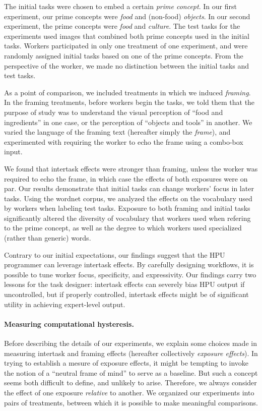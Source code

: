 \documentclass[12pt]{article}
\begin{document}
The initial tasks were chosen to embed a certain \textit{prime concept}.
In our first experiment, our prime concepts were \textit{food} and (non-food) 
\textit{objects}.  In our second experiment, the prime concepts were 
\textit{food} and \textit{culture}.  The test tasks for the experiments used 
images that combined both prime concepts used in the initial tasks. Workers 
participated in only one treatment of one experiment, and were randomly 
assigned initial tasks based on one of the 
prime concepts.  From the perspective of the worker, we made no distinction 
between the initial tasks and test tasks.

As a point of comparison, we included treatments in which we induced
\textit{framing}.
In the framing treatments, before workers begin the tasks, we told them that 
the purpose of study was to understand the visual perception of 
``food and ingredients'' in one case, or the 
perception of ``objects and tools'' in another.  We varied the language of 
the framing text (hereafter simply the \textit{frame}), and experimented with 
requiring the worker to echo the frame using a combo-box input.

We found that intertask effects were stronger than framing, unless the worker
was required to echo the frame, in which case the effects of both exposures were on par.  
Our results demonstrate that initial tasks can change 
workers' focus in later tasks.  Using the wordnet corpus, we analyzed 
the effects on the vocabulary used by workers when 
labeling test tasks. 
Exposure to both framing and initial tasks significantly altered the 
diversity of vocabulary that workers used when refering to the prime concept,
as well as the degree to which workers used specialized (rather than generic) 
words.

Contrary to our initial expectations, our findings suggest that the HPU 
programmer can leverage intertask effects.  By carefully designing workflows,
it is possible to tune worker focus, specificity, and expressivity.  Our 
findings carry two lessons for the task designer: intertask
effects can severely bias HPU output if uncontrolled, but if properly 
controlled, intertask effects might be of significant utility in achieving 
expert-level output.

\paragraph*{Measuring computational hysteresis.}
Before describing the details of our experiments, we explain some 
choices made in measuring intertask and framing effects 
(hereafter collectively \textit{exposure effects}).  
In trying to establish a mesure of exposure effects, it might be tempting to 
invoke the notion of a ``neutral frame of mind'' to serve as a baseline. 
But such a concept seems both difficult to define, and unlikely to arise.
Therefore, we always consider the effect of one exposure 
\textit{relative} to another.  We organized our experiments 
into pairs of treatments, between which it is possible to make meaningful 
comparisons.  
\end{document}
